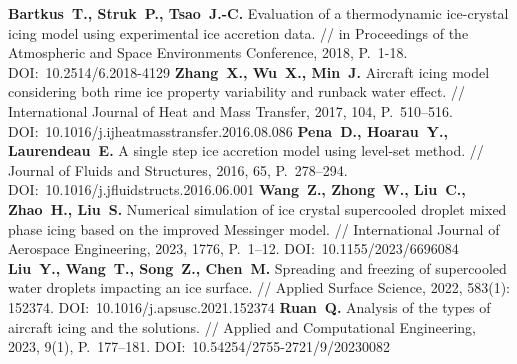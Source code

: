 \begin{thebibliography}{99}
\textbf{Bartkus~T., Struk~P., Tsao~J.-C.} Evaluation of a thermodynamic ice-crystal icing model using experimental ice accretion data. // in Proceedings of the Atmospheric and Space Environments Conference, 2018, P.~1-18. DOI:~10.2514/6.2018-4129
\textbf{Zhang~X., Wu~X., Min~J.} Aircraft icing model considering both rime ice property variability and runback water effect. // International Journal of Heat and Mass Transfer, 2017, 104, P.~510–516. DOI:~10.1016/j.ijheatmasstransfer.2016.08.086
\textbf{Pena~D., Hoarau~Y., Laurendeau~E.} A single step ice accretion model using level-set method. // Journal of Fluids and Structures, 2016, 65, P.~278–294. DOI:~10.1016/j.jfluidstructs.2016.06.001
\textbf{Wang~Z., Zhong~W., Liu~C., Zhao~H., Liu~S.} Numerical simulation of ice crystal supercooled droplet mixed phase icing based on the improved Messinger model. // International Journal of Aerospace Engineering, 2023, 1776, P.~1–12. DOI:~10.1155/2023/6696084
\textbf{Liu~Y., Wang~T., Song~Z., Chen~M.} Spreading and freezing of supercooled water droplets impacting an ice surface. // Applied Surface Science, 2022, 583(1): 152374. DOI:~10.1016/j.apsusc.2021.152374
\textbf{Ruan~Q.} Analysis of the types of aircraft icing and the solutions. // Applied and Computational Engineering, 2023, 9(1), P.~177–181. DOI:~10.54254/2755-2721/9/20230082


\end{thebibliography}
